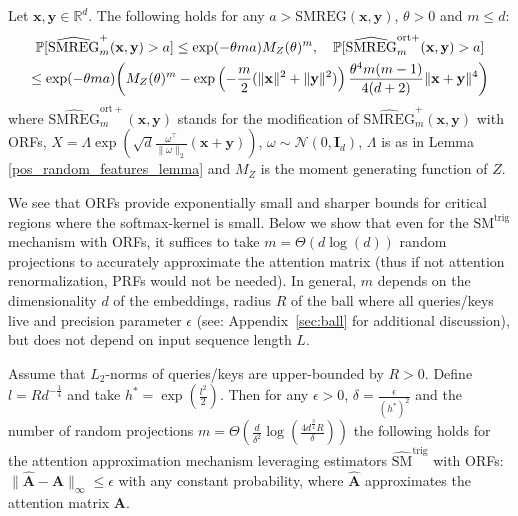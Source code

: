 \begin{theorem}
\label{ort-theorem}
Let $\mathbf{x}, \mathbf{y} \in \mathbb{R}^{d}$. The following holds for any $a > \mathrm{SMREG}(\mathbf{x},\mathbf{y})$, $\theta > 0$ and $m \leq d$:
\begin{gather*}
    \mathbb{P}[\widehat{\mathrm{SMREG}}^{+}_{m}(\mathbf{x}, \mathbf{y}) > a] \leq \exp(-\theta m a) M_Z (\theta)^m, \quad \mathbb{P}[\widehat{\mathrm{SMREG}}^{\mathrm{ort+}}_{m}(\mathbf{x}, \mathbf{y}) > a] \\
    \leq \exp(-\theta m a) \biggl( M_Z (\theta)^m - \exp\left(-\frac{m}{2} (\| \mathbf{x} \|^2 + \| \mathbf{y} \|^2)\right) \frac{\theta^4 m (m - 1)}{4 (d + 2)} \| \mathbf{x} + \mathbf{y} \|^4 \biggr)
\end{gather*}
where $\widehat{\mathrm{SMREG}}^{\mathrm{ort+}}_{m}(\mathbf{x}, \mathbf{y})$ stands for the modification of $\widehat{\mathrm{SMREG}}^{\mathrm{+}}_{m}(\mathbf{x}, \mathbf{y})$ with ORFs, $X = \Lambda \exp(\sqrt{d}\frac{\omega^{\top}}{\|\omega\|_{2}}(\mathbf{x}+\mathbf{y}))$, $\omega \sim \mathcal{N}(0,\mathbf{I}_{d})$, $\Lambda$ is as in Lemma \ref{pos_random_features_lemma} and
$M_{Z}$ is the moment generating function of $Z$.
\end{theorem}

We see that ORFs provide exponentially small and sharper bounds for critical regions where the softmax-kernel is small. 
Below we show that even for the $\mathrm{SM}^{\mathrm{trig}}$ mechanism with ORFs, it suffices to take $m=\Theta(d\log(d))$ random projections to accurately approximate the attention matrix (thus if not attention renormalization, PRFs would not be needed). In general, $m$ depends on the dimensionality $d$ of the embeddings, radius $R$ of the ball where all queries/keys live and precision parameter $\epsilon$ (see: Appendix~\ref{sec:ball} for additional discussion), but does not depend on input sequence length $L$.


\begin{theorem}
\label{thm:uniform}
Assume that $L_{2}$-norms of queries/keys are upper-bounded by $R>0$. Define $l=Rd^{-\frac{1}{4}}$ and take 
$h^{*} = \exp(\frac{l^{2}}{2})$.
Then for any $\epsilon>0$, $\delta=\frac{\epsilon}{(h^{*})^{2}}$
and the number of random projections $m=\Theta(\frac{d}{\delta^{2}}\log(\frac{4d^{\frac{3}{4}} R}{\delta}))$ the following holds for the attention approximation mechanism leveraging estimators $\widehat{\mathrm{SM}}^{\mathrm{trig}}$ with ORFs:
$\|\widehat{\mathbf{A}}-\mathbf{A}\|_{\infty} \leq \epsilon$ with any constant probability, where $\widehat{\mathbf{A}}$ approximates the attention matrix $\mathbf{A}$.
\end{theorem}







